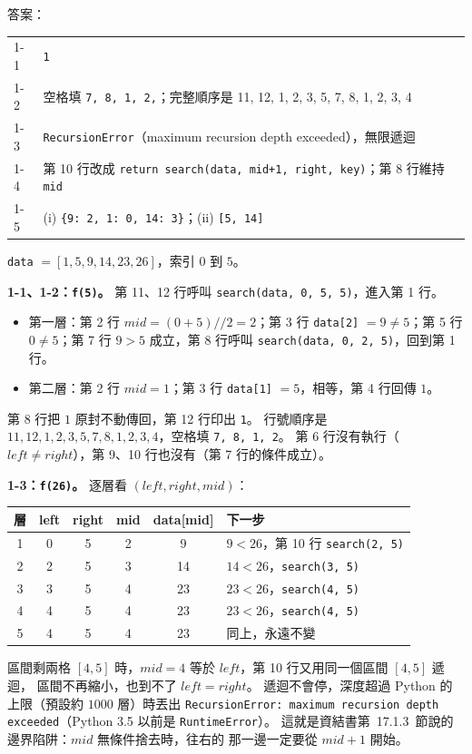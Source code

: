 \begin{pastsoln}
答案：
\begin{center}
\begin{tabular}{ll}
\toprule
1-1 & \texttt{1} \\
1-2 & 空格填 \texttt{7, 8, 1, 2,}；完整順序是 11, 12, 1, 2, 3, 5, 7, 8, 1, 2, 3, 4 \\
1-3 & \texttt{RecursionError}（maximum recursion depth exceeded），無限遞迴 \\
1-4 & 第 10 行改成 \texttt{return search(data, mid+1, right, key)}；第 8 行維持 \texttt{mid} \\
1-5 & (i) \texttt{\{9: 2, 1: 0, 14: 3\}}；(ii) \texttt{[5, 14]} \\
\bottomrule
\end{tabular}
\end{center}

\texttt{data} $= [1, 5, 9, 14, 23, 26]$，索引 $0$ 到 $5$。

\textbf{1-1、1-2：\texttt{f(5)}。} 第 11、12 行呼叫 \texttt{search(data, 0, 5, 5)}，進入第 1 行。
\begin{itemize}
\item 第一層：第 2 行 $\mathit{mid} = (0 + 5) /\!/ 2 = 2$；第 3 行 \texttt{data[2]} $= 9 \ne 5$；第 5 行
$0 \ne 5$；第 7 行 $9 > 5$ 成立，第 8 行呼叫 \texttt{search(data, 0, 2, 5)}，回到第 1 行。
\item 第二層：第 2 行 $\mathit{mid} = 1$；第 3 行 \texttt{data[1]} $= 5$，相等，第 4 行回傳 $1$。
\end{itemize}
第 8 行把 $1$ 原封不動傳回，第 12 行印出 \texttt{1}。 行號順序是
$11, 12, 1, 2, 3, 5, 7, 8, 1, 2, 3, 4$，空格填 \texttt{7, 8, 1, 2}。 第 6 行沒有執行（$\mathit{left} \ne
\mathit{right}$），第 9、10 行也沒有（第 7 行的條件成立）。

\textbf{1-3：\texttt{f(26)}。} 逐層看 $(\mathit{left}, \mathit{right}, \mathit{mid})$：
\begin{center}
\small
\begin{tabular}{cccccl}
\toprule
層 & left & right & mid & data[mid] & 下一步 \\
\midrule
1 & 0 & 5 & 2 & 9 & $9 < 26$，第 10 行 \texttt{search(2, 5)} \\
2 & 2 & 5 & 3 & 14 & $14 < 26$，\texttt{search(3, 5)} \\
3 & 3 & 5 & 4 & 23 & $23 < 26$，\texttt{search(4, 5)} \\
4 & 4 & 5 & 4 & 23 & $23 < 26$，\texttt{search(4, 5)} \\
5 & 4 & 5 & 4 & 23 & 同上，永遠不變 \\
\bottomrule
\end{tabular}
\end{center}
區間剩兩格 $[4, 5]$ 時，$\mathit{mid} = 4$ 等於 $\mathit{left}$，第 10 行又用同一個區間 $[4, 5]$ 遞迴，
區間不再縮小，也到不了 $\mathit{left} = \mathit{right}$。 遞迴不會停，深度超過 Python 的上限（預設約
$1000$ 層）時丟出 \texttt{RecursionError: maximum recursion depth exceeded}（Python 3.5 以前是
\texttt{RuntimeError}）。 這就是資結書第~17.1.3~節說的邊界陷阱：$\mathit{mid}$ 無條件捨去時，往右的
那一邊一定要從 $\mathit{mid} + 1$ 開始。


\end{pastsoln}
